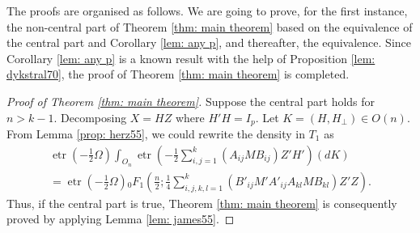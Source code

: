 \documentclass{amsart}
\theoremstyle{definition}
\numberwithin{equation}{section}
\begin{document}
    The proofs are organised as follows. We are going to prove, for the first instance, the non-central part of Theorem \ref{thm: main theorem} based on the equivalence of the central part and Corollary \ref{lem: any p}, and thereafter, the equivalence. Since Corollary \ref{lem: any p} is a known result with the help of Proposition \ref{lem: dykstral70}, the proof of Theorem \ref{thm: main theorem} is completed.



\begin{proof}[Proof of Theorem \ref{thm: main theorem}]
    Suppose the central part holds for $n > k-1$. Decomposing $ X =  H  Z$ where $ H' H =  I_p$.
    Let $K = (H,H_{\perp}) \in O(n)$. From Lemma \ref{prop: herz55}, we could rewrite the density in $T_1$ as 
    \[\begin{aligned}
        \operatorname{etr} \left(-\frac{1}{2}  \varOmega\right)\int_{O_n}\operatorname{etr}\left(-\frac{1}{2} \sum_{i,j=1}^{k}( A_{ij} M B_{ij})Z'H' \right) (d K) \\
        = \operatorname{etr} \left(-\frac{1}{2}  \varOmega\right){}_{0}F_{1}\left(\frac{n}{2};\frac{1}{4}\sum_{i,j,k,l=1}^{k}( B'_{ij} M'A'_{ij}A_{kl} M B_{kl}) Z'Z\right).    \end{aligned}\]
    Thus, if the central part is true, Theorem \ref{thm: main theorem} is consequently proved by applying Lemma \ref{lem: james55}. 
    

\end{proof}
\end{document}
